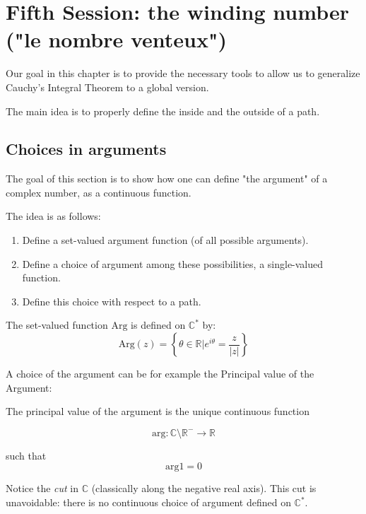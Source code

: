\section{Fifth Session: the winding number ("le nombre venteux")}

Our goal in this chapter is to provide the necessary tools to allow us to generalize Cauchy's Integral Theorem to a global version.

The main idea is to properly define the inside and the outside of a path.

\subsection{Choices in arguments}

The goal of this section is to show how one can define "the argument" of a complex number, as a continuous function. 

The idea is as follows:
\begin{enumerate}
    \item Define a set-valued argument function (of all possible arguments).
    \item Define a choice of argument among these possibilities, a single-valued function.
    \item Define this choice with respect to a path.
\end{enumerate}

\begin{defi}
    The set-valued function $\mathrm{Arg}$ is defined on $\mathbb{C}^*$ by:
$$ \mathrm{Arg}(z) = \left \lbrace \theta \in \mathbb{R} \bigg\vert e^{i\theta} = \frac{z}{|z|}\right \rbrace$$
\end{defi}

A choice of the argument can be for example the Principal value of the Argument:

\begin{thm*}
    The principal value of the argument is the unique continuous function

    $$\mathrm{arg}: \mathbb{C} \setminus \mathbb{R}^{-} \rightarrow \mathbb{R}$$

    such that $$ \mathrm{arg} 1 = 0$$ 
\end{thm*}

\begin{note}
    Notice the \emph{cut} in $\mathbb{C}$ (classically along the negative real axis). This cut is unavoidable: there is no continuous choice of argument defined on $\mathbb{C}^*$.
\end{note}

